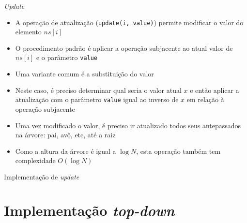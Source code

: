 \begin{frame}[fragile]{\it Update}

    \begin{itemize}
        \item A operação de atualização (\texttt{update(i, value)}) permite modificar o valor do
            elemento $ns[i]$

        \item O procedimento padrão é aplicar a operação subjacente ao atual valor de $ns[i]$
            e o parâmetro \texttt{value}

        \item Uma variante comum é a substituição do valor

        \item Neste caso, é preciso determinar qual seria o valor atual $x$ e então aplicar a
            atualização com o parâmetro \texttt{value} igual ao inverso de $x$ em relação à
            operação subjacente

        \item Uma vez modificado o valor, é preciso ir atualizado todos seus antepassados na
            árvore: pai, avô, etc, até a raiz

        \item Como a altura da árvore é igual a $\log N$, esta operação também tem complexidade
            $O(\log N)$
    \end{itemize}

\end{frame}




\begin{frame}[fragile]{Implementação de {\it update}}
\end{frame}

\section{Implementação {\it top-down}}

